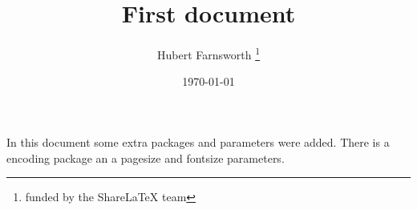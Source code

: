 \documentclass[12pt, letterpaper]{article}
\title{First document}
\author{Hubert Farnsworth \thanks{funded by the ShareLaTeX team}}
\date{\today}
\begin{document}
 
\begin{titlepage}
\maketitle
\end{titlepage}
 
In this document some extra packages and parameters
were added. There is a encoding package
an a pagesize and fontsize parameters.
 
\end{document}
